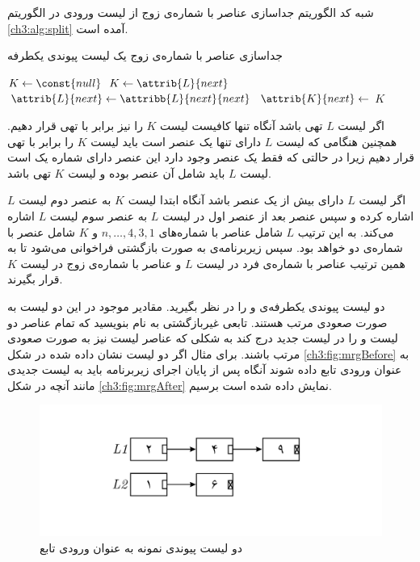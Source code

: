 
شبه کد الگوریتم جداسازی عناصر با شماره‌ی زوج از لیست ورودی در الگوریتم {\eqref{ch3:alg:split}} آمده است.
\begin{algorithm}
\caption{جداسازی عناصر با شماره‌ی زوج یک لیست پیوندی یکطرفه}\label{ch3:alg:split}
\begin{latin}
\begin{algorithmic}[1]
				\State $K \gets \const{null}$
		\Else
				\State	$K \gets \attrib{L}{next}$
				\State	$\attrib{L}{next} \gets \attribb{L}{next}{next}$
				\State	$\attrib{K}{next} \gets $
		\EndIf
		\State	\Return $K$
\EndFunction
\end{algorithmic}
\end{latin}
\end{algorithm}

اگر لیست {$L$} تهی باشد آنگاه تنها کافیست لیست {$K$} را نیز برابر با تهی قرار دهیم. همچنین هنگامی که لیست {$L$} دارای تنها یک عنصر است  باید لیست {$K$} را برابر با تهی قرار دهیم زیرا در حالتی که فقط یک عنصر وجود دارد این عنصر دارای شماره یک است لیست {$L$} باید شامل آن عنصر بوده و لیست {$K$} تهی باشد.

اگر لیست {$L$} دارای بیش از یک عنصر باشد آنگاه ابتدا لیست {$K$} به عنصر دوم لیست {$L$} اشاره کرده و سپس عنصر بعد از عنصر اول در لیست {$L$} به عنصر سوم لیست {$L$} اشاره می‌کند. به این ترتیب {$L$} شامل عناصر با شماره‌های {$n ,\ldots , 4,3,1$}  و {$K$} شامل عنصر با شماره‌ی دو خواهد بود. سپس زیربرنامه‌ی {} به صورت بازگشتی  فراخوانی می‌شود تا به همین ترتیب عناصر با شماره‌ی فرد در لیست {$L$} و عناصر با شماره‌ی زوج در لیست {$K$} قرار بگیرند.

 دو لیست پیوندی یکطرفه‌ی {} و {} را در نظر بگیرید. مقادیر موجود در این دو لیست به صورت صعودی مرتب هستند. تابعی غیربازگشتی به نام {} بنویسید که تمام عناصر دو لیست {} و {} را در لیست جدید {} درج کند به شکلی که عناصر لیست {} نیز به صورت صعودی مرتب باشند. برای مثال اگر دو لیست نشان داده شده در شکل {\eqref{ch3:fig:mrgBefore}} به عنوان ورودی تابع {} داده شوند آنگاه پس از پایان اجرای زیربرنامه باید به لیست جدیدی مانند آنچه در شکل {\eqref{ch3:fig:mrgAfter}} نمایش داده شده است برسیم.

\begin{figure}
\begin{center}
\includegraphics[scale=0.33]{figs/ch3/merge_input_lists.pdf}
\caption{دو لیست پیوندی نمونه به عنوان ورودی تابع {}}\label{ch3:fig:mrgBefore}
\end{center}
\end{figure}

